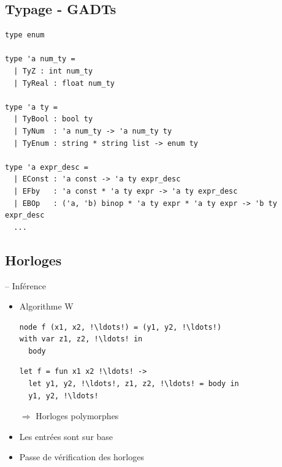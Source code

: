 \documentclass[11pt,usenames,dvipsnames]{beamer}
\newcommand{\inline}[1]{{\ttfamily #1}}
\begin{document}
\subsection{Typage - GADTs}
\begin{frame}[fragile]{\null}
  \begin{lstlisting}[language=caml]
type enum

type 'a num_ty =
  | TyZ : int num_ty
  | TyReal : float num_ty

type 'a ty =
  | TyBool : bool ty
  | TyNum  : 'a num_ty -> 'a num_ty ty
  | TyEnum : string * string list -> enum ty

type 'a expr_desc =
  | EConst : 'a const -> 'a ty expr_desc
  | EFby   : 'a const * 'a ty expr -> 'a ty expr_desc
  | EBOp   : ('a, 'b) binop * 'a ty expr * 'a ty expr -> 'b ty expr_desc
  ...
  \end{lstlisting}
\end{frame}

\subsection{Horloges}
\begin{frame}[fragile]{-- Inférence}
  \begin{itemize}
  \item<1-> Algorithme W
    \begin{lstlisting}[language=minils, escapechar=!]
node f (x1, x2, !\ldots!) = (y1, y2, !\ldots!)
with var z1, z2, !\ldots! in
  body
    \end{lstlisting}
    \begin{lstlisting}[language=caml, escapechar=!]
let f = fun x1 x2 !\ldots! ->
  let y1, y2, !\ldots!, z1, z2, !\ldots! = body in
  y1, y2, !\ldots!
    \end{lstlisting}
    $\Rightarrow$ Horloges polymorphes
  \item<2-> Les entrées sont sur \inline{base}
  \item<3-> Passe de vérification des horloges
  \end{itemize}
\end{frame}
\end{document}
